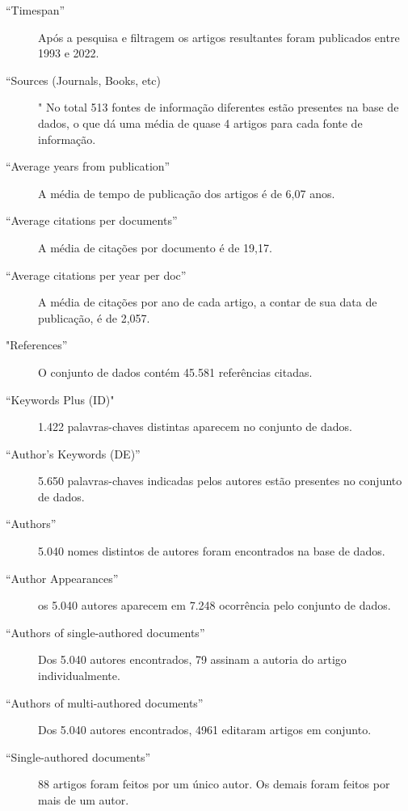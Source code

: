 \begin{description}
    \item [``Timespan''] Após a pesquisa e filtragem os artigos resultantes foram publicados entre 1993 e 2022.
    
    \item [``Sources (Journals, Books, etc)]" No total 513 fontes de informação diferentes estão presentes na base de dados, o que dá uma média de quase 4 artigos para cada fonte de informação.
    
    \item [``Average years from publication'']  A média de tempo de publicação dos artigos é de 6,07 anos.
    
    \item [``Average citations per documents''] A média de citações por documento é de 19,17.
    
    \item [``Average citations per year per doc''] A média de citações por ano de cada artigo, a contar de sua data de publicação, é de 2,057.
    
    \item [ "References''] O conjunto de dados contém 45.581 referências citadas.
    
    \item [``Keywords Plus (ID)" ] 1.422 palavras-chaves distintas aparecem no conjunto de dados.
    
    \item [``Author's Keywords (DE)''] 5.650 palavras-chaves indicadas pelos autores estão presentes no conjunto de dados.
    
    \item [``Authors''] 5.040 nomes distintos de autores foram encontrados na base de dados.
    
    \item [``Author Appearances''] os 5.040 autores aparecem em 7.248 ocorrência pelo conjunto de  dados.
    
    \item [``Authors of single-authored documents''] Dos 5.040 autores encontrados, 79 assinam a autoria do artigo individualmente.
    
    \item [``Authors of multi-authored documents''] Dos 5.040 autores encontrados, 4961 editaram artigos em conjunto.
    
    \item [``Single-authored documents''] 88 artigos foram feitos por um único autor. Os demais foram feitos por mais de um autor.
    

\end{description}
